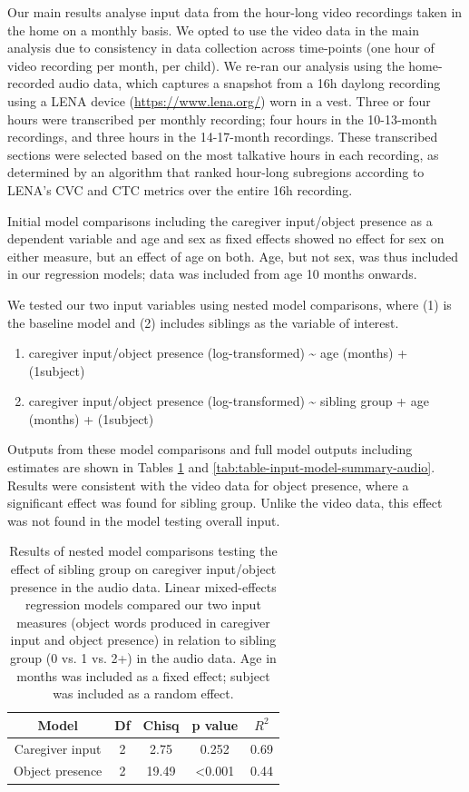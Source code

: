 \documentclass[
  man,mask,floatsintext]{apa6}
\providecommand{\tightlist}{%
  \setlength{\itemsep}{0pt}\setlength{\parskip}{0pt}}
\begin{document}
Our main results analyse input data from the hour-long video recordings taken in the home on a monthly basis. We opted to use the video data in the main analysis due to consistency in data collection across time-points (one hour of video recording per month, per child). We re-ran our analysis using the home-recorded audio data, which captures a snapshot from a 16h daylong recording using a LENA device (\url{https://www.lena.org/}) worn in a vest. Three or four hours were transcribed per monthly recording; four hours in the 10-13-month recordings, and three hours in the 14-17-month recordings. These transcribed sections were selected based on the most talkative hours in each recording, as determined by an algorithm that ranked hour-long subregions according to LENA's CVC and CTC metrics over the entire 16h recording.

Initial model comparisons including the caregiver input/object presence as a dependent variable and age and sex as fixed effects showed no effect for sex on either measure, but an effect of age on both. Age, but not sex, was thus included in our regression models; data was included from age 10 months onwards.

We tested our two input variables using nested model comparisons, where (1) is the baseline model and (2) includes siblings as the variable of interest.

\begin{enumerate}
\def\labelenumi{\arabic{enumi}.}
\tightlist
\item
  caregiver input/object presence (log-transformed) \textasciitilde{} age (months) + (1\textbar subject)
\item
  caregiver input/object presence (log-transformed) \textasciitilde{} sibling group + age (months) + (1\textbar subject)
\end{enumerate}

Outputs from these model comparisons and full model outputs including estimates are shown in Tables \ref{tab:table-model-comparisons-audio} and \ref{tab:table-input-model-summary-audio}. Results were consistent with the video data for object presence, where a significant effect was found for sibling group. Unlike the video data, this effect was not found in the model testing overall input.

\begin{longtable}[t]{ccccc}
\caption{\label{tab:table-model-comparisons-audio}Results of nested model comparisons testing the effect of sibling group on caregiver input/object presence in the audio data. Linear mixed-effects regression models compared our two input measures (object words produced in caregiver input  and object presence) in relation to sibling group (0 vs. 1 vs. 2+) in the audio data. Age in months was included as a fixed effect; subject was included as a random effect.}\\
\toprule
Model & Df & Chisq & p value & $R^{2}$\\
\midrule
Caregiver input & 2 & 2.75 & 0.252 & 0.69\\
Object presence & 2 & 19.49 & <0.001 & 0.44\\
\bottomrule
\end{longtable}
\end{document}

